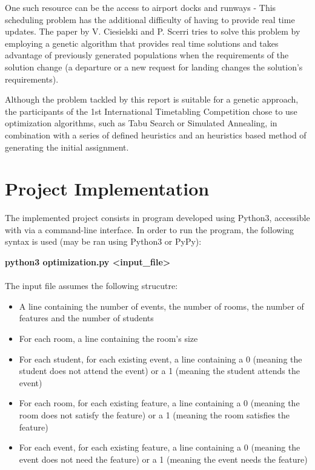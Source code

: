\documentclass[conference]{IEEEtran}
\begin{document}
One such resource can be the access to airport docks and runways - This scheduling problem has the additional difficulty of having to provide real time updates. The paper by V. Ciesielski and P. Scerri \cite{air} tries to solve this problem by employing a genetic algorithm that provides real time solutions and takes advantage of previously generated populations when the requirements of the solution change (a departure or a new request for landing changes the solution's requirements).

Although the problem tackled by this report is suitable for a genetic approach, the participants of the 1st International Timetabling Competition chose to use optimization algorithms, such as Tabu Search \cite{sol2} or Simulated Annealing\cite{sol1}, in combination with a series of defined heuristics and an heuristics based method of generating the initial assignment. 

\section{Project Implementation}

The implemented project consists in program developed using Python3, accessible with via a command-line interface. In order to run the program, the following syntax is used (may be ran using Python3 or PyPy):

\textbf{python3 optimization.py \textless input\_file\textgreater}
\\\\
The input file assumes the following strucutre:
\begin{itemize}
    \item A line containing the number of events, the number of rooms, the number of features and the number of students
    \item For each room, a line containing the room's size
    \item For each student, for each existing event, a line containing a 0 (meaning the student does not attend the event) or a 1 (meaning the student attends the event)
    \item For each room, for each existing feature, a line containing a 0 (meaning the room does not satisfy the feature) or a 1 (meaning the room satisfies the feature)
    \item For each event, for each existing feature, a line containing a 0 (meaning the event does not need the feature) or a 1 (meaning the event needs the feature)
\end{itemize}
\end{document}
